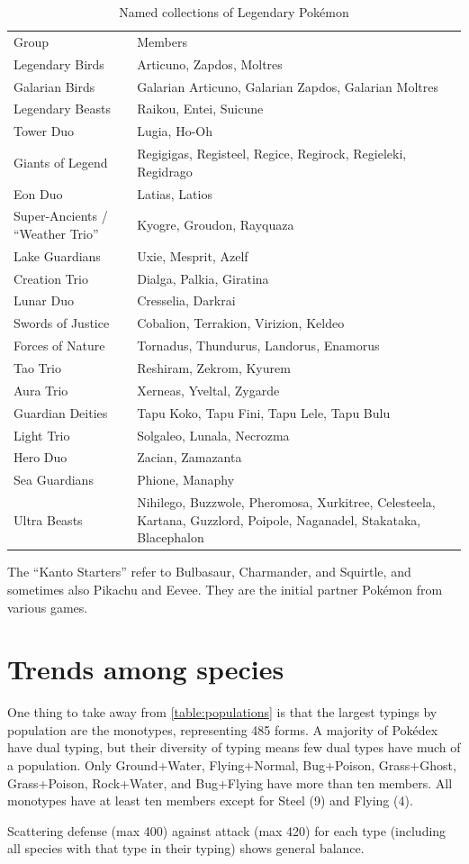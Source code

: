 \begin{table}
\begin{tabular}{lp{}}
Group & Members\\
\Midrule
Legendary Birds & Articuno, Zapdos, Moltres\\
Galarian Birds & Galarian Articuno, Galarian Zapdos, Galarian Moltres\\
Legendary Beasts & Raikou, Entei, Suicune\\
Tower Duo & Lugia, Ho-Oh\\
Giants of Legend & Regigigas, Registeel, Regice, Regirock, Regieleki, Regidrago\\
Eon Duo & Latias, Latios\\
Super-Ancients / ``Weather Trio'' & Kyogre, Groudon, Rayquaza\\
Lake Guardians & Uxie, Mesprit, Azelf\\
Creation Trio & Dialga, Palkia, Giratina\\
Lunar Duo & Cresselia, Darkrai\\
Swords of Justice & Cobalion, Terrakion, Virizion, Keldeo\\
Forces of Nature & Tornadus, Thundurus, Landorus, Enamorus\\
Tao Trio & Reshiram, Zekrom, Kyurem\\
Aura Trio & Xerneas, Yveltal, Zygarde\\
Guardian Deities & Tapu Koko, Tapu Fini, Tapu Lele, Tapu Bulu\\
Light Trio & Solgaleo, Lunala, Necrozma\\
Hero Duo & Zacian, Zamazanta\\
Sea Guardians & Phione, Manaphy\\
Ultra Beasts & Nihilego, Buzzwole, Pheromosa, Xurkitree, Celesteela, Kartana, Guzzlord,
               Poipole, Naganadel, Stakataka, Blacephalon \\
\end{tabular}
\caption{Named collections of Legendary Pokémon\label{table:namedmyths}}
\end{table}

\begin{tipbox}[title=Kanto Starters]
The ``Kanto Starters'' refer to Bulbasaur, Charmander, and Squirtle, and sometimes
  also Pikachu and Eevee.
They are the initial partner Pokémon from various games.
\end{tipbox}

\section{Trends among species}
One thing to take away from \autoref{table:populations} is that the largest
  typings by population are the monotypes, representing 485 forms.
A majority of Pokédex have dual typing, but their diversity of typing means few dual types have much of a population.
Only Ground+Water, Flying+Normal, Bug+Poison, Grass+Ghost, Grass+Poison, Rock+Water, and Bug+Flying
  have more than ten members.
All monotypes have at least ten members except for Steel (9) and Flying (4).

Scattering defense (max 400) against attack (max 420) for each type
  (including all species with that type in their typing) shows general
  balance.

